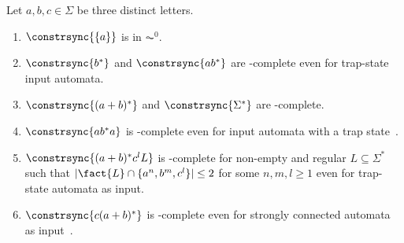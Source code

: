 \begin{theorem}
	\label{constr_sync:thm:introductory_examples}
	Let $a,b,c \in \Sigma$ be three distinct letters.
	\begin{enumerate}
		
		\item \label{constrsync:ex:item:a} $\constrsync{\{a\}}$ is in $\AC^0$.
		
		\item \label{constrsync:ex:item:bstar} $\constrsync{b^*}$ and $\constrsync{ab^*}$ are \LOGSPACE-complete
	    even for trap-state input automata.
		
		\item \label{constrsync:ex:item:ab} $\constrsync{(a+b)^*}$ and $\constrsync{\Sigma^*}$ are \NL-complete. 
	
		\item \label{constrsync:ex:item:abstara} $\constrsync{ab^*a}$ is \NP-complete even for input automata with a trap state~\cite{FernauGHHVW19}.
		
		\item \label{constrsync:ex:item:abcL} $\constrsync{(a+b)^*c^lL}$ is \PSPACE-complete for 
		non-empty and regular $L \subseteq \Sigma^*$ such that $|\fact{L} \cap \{a^n, b^m, c^l \}| \le 2$
		for some $n,m, l \ge 1$ even for trap-state automata as input.
		
		\item \label{constrsync:ex:item:cab} $\constrsync{c(a+b)^*}$ is \PSPACE-complete even for strongly connected automata as input~\cite{FernauGHHVW19}.	
	\end{enumerate}
\end{theorem}
